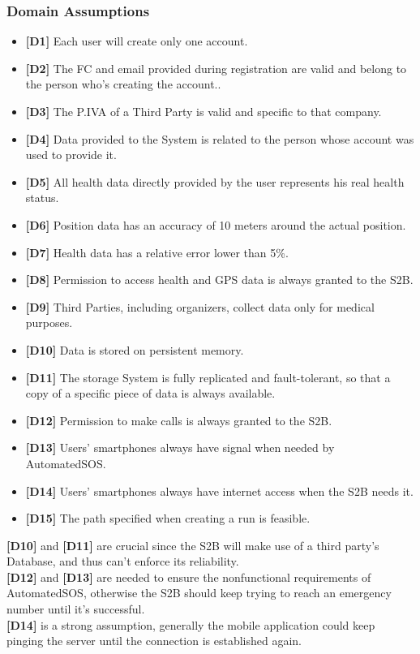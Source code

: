 \documentclass[titlepage]{article}
\begin{document}
		\subsubsection{Domain Assumptions}
		\begin{itemize}
		 \item {\bf [D1]}  Each user will create only one account.				
			 \item {\bf [D2]} The FC and email provided during registration are valid and belong to the person who’s creating the account..
   			 \item {\bf [D3]} The P.IVA of a Third Party is valid and specific to that company.
   			 \item {\bf [D4]}  Data provided to the System is related to the person whose account was used to provide it.
   			 \item {\bf [D5]} All health data directly provided by the user represents his real health status.
			  \item {\bf [D6]}  Position data has an accuracy of 10 meters around the actual position.				
			 \item {\bf [D7]} Health data has a relative error lower than 5\%.
   			 \item {\bf [D8]} Permission to access health and GPS data is always granted to the S2B.
   			 \item {\bf [D9]} Third Parties, including organizers, collect data only for medical purposes.
   			 \item {\bf [D10]} Data is stored on persistent memory.
			 \item {\bf [D11]} The storage System is fully replicated and fault-tolerant, so that a copy of a specific piece of data is always available.			
			 \item {\bf [D12]} Permission to make calls is always granted to the S2B.   			 
			 \item {\bf [D13]} Users’ smartphones always have signal when needed by AutomatedSOS.
   			 \item {\bf [D14]} Users’ smartphones always have internet access when the S2B needs it.
   			 \item {\bf [D15]} The path specified when creating a run is feasible. \\
		\end{itemize}
		{\bf[D10]} and {\bf [D11]} are crucial since the S2B will make use of a third party’s Database, and thus can’t enforce its reliability.\\
{\bf [D12]} and {\bf [D13]} are needed to ensure the nonfunctional requirements of AutomatedSOS, otherwise the S2B should keep trying to reach an emergency number until it’s successful.\\
{\bf [D14]} is a strong assumption, generally the mobile application could keep pinging the server until the connection is established again.\\
\end{document}
